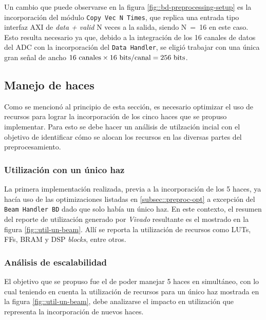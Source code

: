 \documentclass[../../main.tex]{subfiles}
\begin{document}
Un cambio que puede observarse en la figura \ref{fig::bd-preprocessing-setup} es la incorporación del módulo \texttt{Copy Vec N Times}, que replica una entrada tipo interfaz AXI de \textit{data + valid} N veces a la salida, siendo N~=~16 en este caso. Esto resulta necesario ya que, debido a la integración de los 16 canales de datos del ADC con la incorporación del \texttt{Data Handler}, se eligió trabajar con una única gran señal de ancho $16~\textrm{canales} \times 16~\textrm{bits/canal} = 256~\textrm{bits}$.


\subsection{Manejo de haces}\label{subsec::beam-handling}
Como se mencionó al principio de esta sección, es necesario optimizar el uso de recursos para lograr la incorporación de los cinco haces que se propuso implementar. Para esto se debe hacer un análisis de utilzación incial con el objetivo de identificar cómo se alocan los recursos en las diversas partes del preprocesamiento.

\subsubsection{Utilización con un único haz}
La primera implementación realizada, previa a la incorporación de los 5 haces, ya hacía uso de las optimizaciones listadas en \ref{subsec::preproc-opt} a excepción del \texttt{Beam Handler BD} dado que solo había un único haz. En este contexto, el resumen del reporte de utilización generado por \textit{Vivado} resultante es el mostrado en la figura \ref{fig::util-un-beam}. Allí se reporta la utilización de recursos como LUTs, FFs, BRAM y DSP \textit{blocks}, entre otros.


\subsubsection{Análisis de escalabilidad}
El objetivo que se propuso fue el de poder manejar 5 haces en simultáneo, con lo cual teniendo en cuenta la utilización de recursos para un único haz mostrada en la figura \ref{fig::util-un-beam}, debe analizarse el impacto en utilización que representa la incorporación de nuevos haces.
\end{document}
